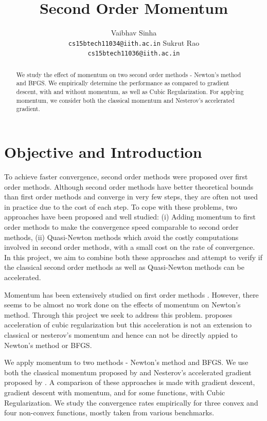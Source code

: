\documentclass{article}
\title{Second Order Momentum}
\author{
  Vaibhav Sinha \\
  \texttt{cs15btech11034@iith.ac.in}
  \And
  Sukrut Rao \\
  \texttt{cs15btech11036@iith.ac.in}
}
\begin{document}
\maketitle

\begin{abstract}
  We study the effect of momentum on two second order methods - Newton's method and BFGS. We empirically determine the performance as compared to gradient descent, with and without momentum, as well as Cubic Regularization. For applying momentum, we consider both the classical momentum and Nesterov's accelerated gradient.
\end{abstract}

\section{Objective and Introduction}\label{introduction}

To achieve faster convergence, second order methods were proposed over first order methods. Although second order methods have better theoretical bounds than first order methods and converge in very few steps, they are often not used in practice due to the cost of each step. To cope with these problems, two approaches have been proposed and well studied: (i) Adding momentum \cite{POLYAK19641,Sutskever} to first order methods to make the convergence speed comparable to second order methods, (ii) Quasi-Newton methods \citep{davidon,broyden1965class,nocedal1980updating} which avoid the costly computations involved in second order methods, with a small cost on the rate of convergence. In this project, we aim to combine both these approaches and attempt to verify if the classical second order methods as well as Quasi-Newton methods can be accelerated.

Momentum has been extensively studied on first order methods \citep{POLYAK19641,Sutskever}. However, there seems to be almost no work done on the effects of momentum on Newton’s method. Through this project we seek to address this problem. \citep{Nesterov2008} proposes acceleration of cubic regularization but this acceleration is not an extension to classical or nesterov's momentum and hence can not be directly appied to Newton's method or BFGS.

We apply momentum to two methods - Newton's method and BFGS. We use both the classical momentum proposed by \citep{POLYAK19641} and Nesterov's accelerated gradient proposed by \citet{Sutskever}. A comparison of these approaches is made with gradient descent, gradient descent with momentum, and for some functions, with Cubic Regularization. We study the convergence rates empirically for three convex and four non-convex functions, mostly taken from various benchmarks.
\end{document}
